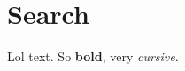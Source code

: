 \documentclass[Main]{subfiles}
\begin{document}
\section{Search} %
	\label{sec:search}

	Lol text.
	So \textbf{bold}, very \emph{cursive}.

\end{document}

